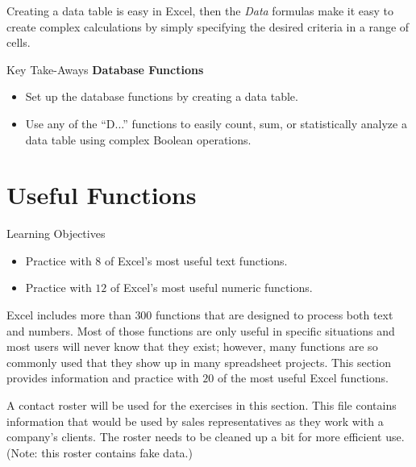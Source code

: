 Creating a data table is easy in Excel, then the \textit{Data} formulas make it easy to create complex calculations by simply specifying the desired criteria in a range of cells.
	
\begin{center}
	\begin{tkwbox}{Key Take-Aways}
		\textbf{Database Functions}
		\\
		\begin{itemize}
			\setlength{\itemsep}{0pt}
			\setlength{\parskip}{0pt}
			\setlength{\parsep}{0pt}
			
			\item Set up the database functions by creating a data table.
			\item Use any of the ``D...'' functions to easily count, sum, or statistically analyze a data table using complex Boolean operations. 
			
		\end{itemize}
	\end{tkwbox}
\end{center}

\section{Useful Functions}

\begin{center}
	\begin{objbox}{Learning Objectives}
		\begin{itemize}
			\setlength{\itemsep}{0pt}
			\setlength{\parskip}{0pt}
			\setlength{\parsep}{0pt}
			
			\item Practice with $ 8 $ of Excel's most useful text functions.
			\item Practice with $ 12 $ of Excel's most useful numeric functions.
			
		\end{itemize}
	\end{objbox}
\end{center}

Excel includes more than $ 300 $ functions that are designed to process both text and numbers. Most of those functions are only useful in specific situations and most users will never know that they exist; however, many functions are so commonly used that they show up in many spreadsheet projects. This section provides information and practice with $ 20 $ of the most useful Excel functions.

A contact roster will be used for the exercises in this section. This file contains information that would be used by sales representatives as they work with a company's clients. The roster needs to be cleaned up a bit for more efficient use. (Note: this roster contains fake data.)

